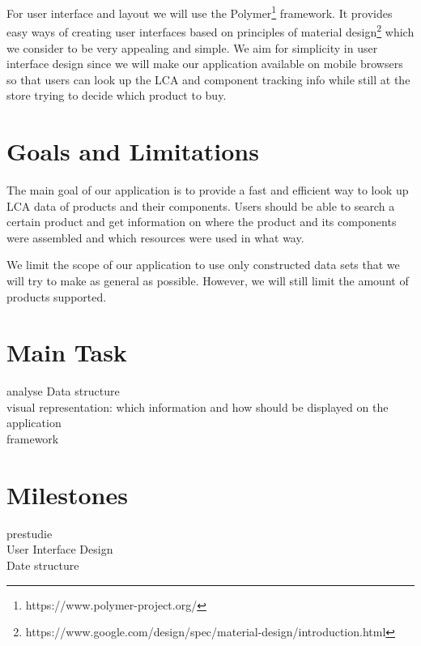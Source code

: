 \documentclass[a4page]{article}
\begin{document}
For user interface and layout we will use the Polymer\footnote{https://www.polymer-project.org/} framework. 
It provides easy ways of creating user interfaces based on principles of material design\footnote{https://www.google.com/design/spec/material-design/introduction.html} which we consider to be very appealing and simple.
We aim for simplicity in user interface design since we will make our application available on mobile browsers so that users can look up the \ac{LCA} and component tracking info while still at the store trying to decide which product to buy.

\section{Goals and Limitations}
The main goal of our application is to provide a fast and efficient way to look up \ac{LCA} data of products and their components.
Users should be able to search a certain product and get information on where the product and its components were assembled and which resources were used in what way. 

We limit the scope of our application to use only constructed data sets that we will try to make as general as possible.
However, we will still limit the amount of products supported.

\section{Main Task}
 analyse Data structure\\
visual representation: which information and how should be displayed on the application\\
framework\\

\section{Milestones}
prestudie\\
User Interface Design\\
Date structure\\

\newpage
\begin{acronym}
\end{acronym}



\end{document}
